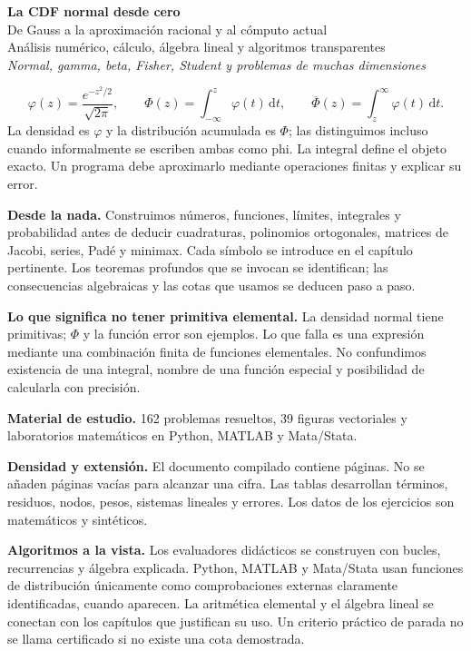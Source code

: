 \documentclass[11pt,a4paper]{article}
\newcommand{\dd}{\,\mathrm d}
\theoremstyle{definition}
\newcounter{problema}
\newcommand{\SF}{\overline\Phi}
\begin{document}
\begin{center}
{\Huge\bfseries\color{azul}La CDF normal desde cero}\\[6pt]
{\Large De Gauss a la aproximación racional y al cómputo actual}\\[5pt]
{\large Análisis numérico, cálculo, álgebra lineal y algoritmos transparentes}\\[4pt]
\textit{Normal, gamma, beta, Fisher, Student y problemas de muchas dimensiones}
\end{center}
\begin{idea}
\[
\varphi(z)=\frac{e^{-z^2/2}}{\sqrt{2\pi}},\qquad
\Phi(z)=\int_{-\infty}^z\varphi(t)\dd t,\qquad
\SF(z)=\int_z^\infty\varphi(t)\dd t.
\]
La densidad es $\varphi$ y la distribución acumulada es $\Phi$; las distinguimos incluso cuando informalmente se escriben ambas como phi. La integral define el objeto exacto. Un programa debe aproximarlo mediante operaciones finitas y explicar su error.
\end{idea}
\textbf{Desde la nada.} Construimos números, funciones, límites, integrales y probabilidad antes de deducir cuadraturas, polinomios ortogonales, matrices de Jacobi, series, Padé y minimax. Cada símbolo se introduce en el capítulo pertinente. Los teoremas profundos que se invocan se identifican; las consecuencias algebraicas y las cotas que usamos se deducen paso a paso.

\textbf{Lo que significa no tener primitiva elemental.} La densidad normal tiene primitivas; $\Phi$ y la función error son ejemplos. Lo que falla es una expresión mediante una combinación finita de funciones elementales. No confundimos existencia de una integral, nombre de una función especial y posibilidad de calcularla con precisión.

\textbf{Material de estudio.} 162 problemas resueltos, 39 figuras vectoriales y laboratorios matemáticos en Python, MATLAB y Mata/Stata.\par
\textbf{Densidad y extensión.} El documento compilado contiene \pageref{ultima-pagina} páginas. No se añaden páginas vacías para alcanzar una cifra. Las tablas desarrollan términos, residuos, nodos, pesos, sistemas lineales y errores. Los datos de los ejercicios son matemáticos y sintéticos.

\textbf{Algoritmos a la vista.} Los evaluadores didácticos se construyen con bucles, recurrencias y álgebra explicada. Python, MATLAB y Mata/Stata usan funciones de distribución únicamente como comprobaciones externas claramente identificadas, cuando aparecen. La aritmética elemental y el álgebra lineal se conectan con los capítulos que justifican su uso. Un criterio práctico de parada no se llama certificado si no existe una cota demostrada.
\end{document}
